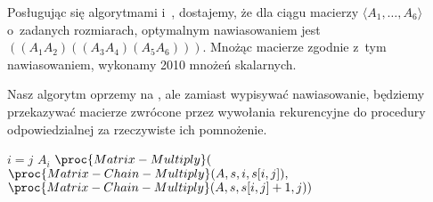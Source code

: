 
\exercise %
Posługując się algorytmami  i~, dostajemy, że dla ciągu macierzy $\langle A_1,\dots,A_6\rangle$ o~zadanych rozmiarach, optymalnym nawiasowaniem jest $((A_1A_2)((A_3A_4)(A_5A_6)))$.
Mnożąc macierze zgodnie z~tym nawiasowaniem, wykonamy 2010 mnożeń skalarnych.

\exercise %
Nasz algorytm oprzemy na , ale zamiast wypisywać nawiasowanie, będziemy przekazywać macierze zwrócone przez wywołania rekurencyjne do procedury odpowiedzialnej za rzeczywiste ich pomnożenie.
\begin{codebox}
\li	\If $i=j$
\li		\Then \Return $A_i$
		\End
\li	\Return $\proc{Matrix-Multiply}($
\zi	\>\>\> $\proc{Matrix-Chain-Multiply}(A,s,i,s[i,j]),$
\zi	\>\>\> $\proc{Matrix-Chain-Multiply}(A,s,s[i,j]+1,j))$
\end{codebox}

\exercise %
\exercise %
\exercise %
